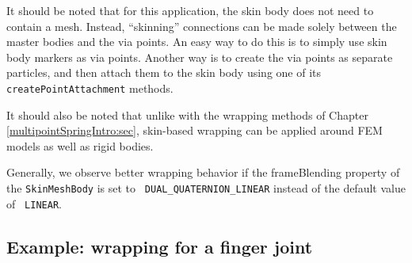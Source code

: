 It should be noted that for this application, the skin body does not
need to contain a mesh. Instead, ``skinning'' connections can be made
solely between the master bodies and the via points. An easy way to do
this is to simply use skin body markers as via points.  Another way is
to create the via points as separate particles, and then attach them
to the skin body using one of its {\tt createPointAttachment} methods.

\begin{sideblock}
It should also be noted that unlike with the wrapping methods of
Chapter \ref{multipointSpringIntro:sec}, skin-based wrapping can be
applied around FEM models as well as rigid bodies.
\end{sideblock}

\begin{sideblock}
Generally, we observe better wrapping behavior if the {\sf
frameBlending} property of the {\tt SkinMeshBody} is set to {\tt
DUAL\_QUATERNION\_LINEAR} instead of the default value of {\tt
LINEAR}.
\end{sideblock}

\subsection{Example: wrapping for a finger joint}


